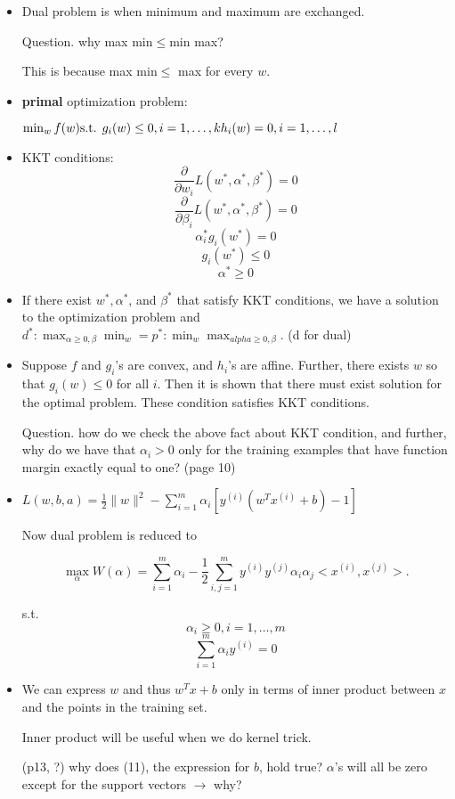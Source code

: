 \documentclass{article}
\theoremstyle{remark}
\begin{document}
\begin{itemize}
 \item Dual problem is when minimum and maximum are exchanged.

 Question. why max min$\leq$min max?

 This is because max min$\leq$ max for every $w$.
\item \textbf{primal} optimization problem:

$\min_w f(w)\\
\text{s.t. } g_i(w)\leq 0, i=1,\dots,k\\h_i(w)=0,i=1,\dots,l$
\item KKT conditions:
$$\frac \partial {\partial w_i} L(w^*, \alpha^*,\beta^*)=0 $$
$$\frac \partial {\partial \beta_i} L(w^*, \alpha^*, \beta^*)=0$$
$$\alpha_i^* g_i (w^*)=0$$
$$g_i (w^*)\leq 0$$
$$\alpha^*\geq 0$$
 \item If there exist $w^*, \alpha^*$, and $\beta^*$ that satisfy KKT conditions, we have a solution to the optimization problem and $d^*: \max_{\alpha\geq 0,\beta} \min_w=p^*: \min_w \max_{alpha\geq 0,\beta}$. (d for dual)
 
\item Suppose $f$ and $g_i$'s are convex, and $h_i$'s are affine. Further, there exists $w$ so that $g_i (w)\leq 0$ for all $i$. Then it is shown that there must exist solution for the optimal problem. These condition satisfies KKT conditions.

 Question. how do we check the above fact about KKT condition, and further, why do we have that $\alpha_i >0$ only for the training examples that have function margin exactly equal to one? (page 10)

 \item $L(w,b,a)=\frac 1 2\lVert w\rVert^2 - \sum^m_{i=1}\alpha_i [y^{(i)}(w^T x^{(i)} +b)-1]$

 Now dual problem is reduced to

 $$\max_\alpha W(\alpha)=\sum^m _{i=1}\alpha_i -\frac 1 2\sum^m_{i,j=1}y^{(i)}y^{(j)}\alpha_i\alpha_j <x^{(i)},x^{(j)}>.$$

 s.t. $$\alpha_i\geq 0,i=1,\dots,m$$
 $$\sum^m_{i=1}\alpha_i y^{(i)}=0$$

\item We can express $w$ and thus $w^Tx+b$ only in terms of inner product between $x$ and the points in the training set.

Inner product will be useful when we do kernel trick.

(p13, ?) why does (11), the expression for $b$, hold true?
$\alpha$'s will all be zero except for the support vectors $\to$ why? 


\end{itemize}
\end{document}

